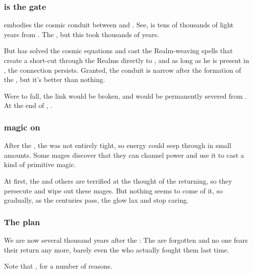 \subsubsection{\Daggerrain{} is the gate}
\Daggerrain{} embodies the cosmic conduit between \Erebos{} and \Nyx. See, \Erebos{} is tens of thousands of light years from \Miith{}. The \banes{} , but this took thousands of years. 

But \Daggerrain{} has solved the cosmic equations and cast the Realm-weaving spells that create a short-cut through the Realms directly to \Erebos, and as long as he is present in \Nyx, the connection persists.
Granted, the conduit is narrow after the formation of the , but it's better than nothing. 

Were \Daggerrain{} to fall, the link would be broken, and \Nyx{} would be permanently severed from \Erebos. At the end of \SentinelsFinalBook, . 





\subsubsection{\Bane{} magic on \Miith}
After the \firstbanewar, the \CrystalSphere{} was not entirely tight, so \Erebean{} energy could seep through in small amounts. Some mages discover that they can channel \bane{} power and use it to cast a kind of primitive \nieur{} magic. 

At first, the \dragons{} and others are terrified at the thought of the \banes{} returning, so they persecute and wipe out these mages. But nothing seems to come of it, so gradually, as the centuries pass, the \dragons{} glow lax and stop caring. 





\subsubsection{The \pps{\banes}{} plan}
We are now several thousand years after the \firstbanewar: The \banes{} are forgotten and no one fears their return any more, barely even the \dragons{} who actually fought them last time. 

Note that , for a number of reasons. 

